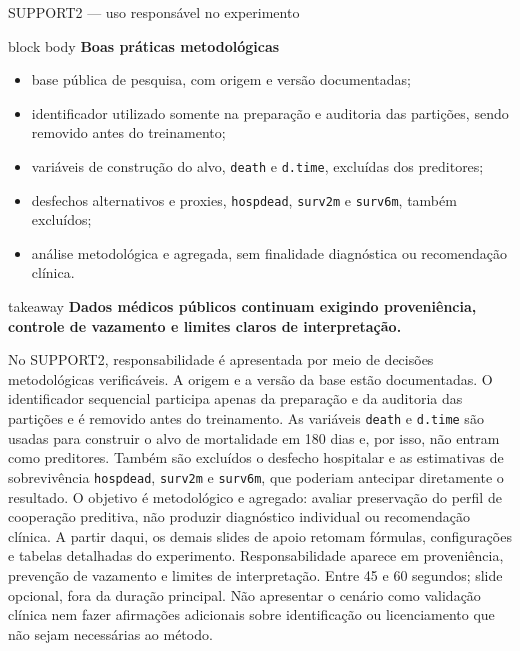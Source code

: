 \begin{frame}{SUPPORT2 — uso responsável no experimento}
  \begin{beamercolorbox}[wd=\linewidth,sep=.17cm,rounded=true]{block body}
    {\sffamily\bfseries\color{CoInfoBlue}Boas práticas metodológicas}\par\vspace{.07cm}
    \begin{itemize}\fontsize{9.0}{10.8}\selectfont\setlength{\itemsep}{.07cm}
      \item base pública de pesquisa, com origem e versão documentadas;
      \item identificador utilizado somente na preparação e auditoria das partições, sendo removido antes do treinamento;
      \item variáveis de construção do alvo, \texttt{death} e \texttt{d.time}, excluídas dos preditores;
      \item desfechos alternativos e proxies, \texttt{hospdead}, \texttt{surv2m} e \texttt{surv6m}, também excluídos;
      \item análise metodológica e agregada, sem finalidade diagnóstica ou recomendação clínica.
    \end{itemize}
  \end{beamercolorbox}

  \vspace{.12cm}
  \begin{beamercolorbox}[wd=\linewidth,sep=.12cm,rounded=true]{takeaway}
    \centering\sffamily\bfseries\fontsize{10.0}{11.9}\selectfont
    Dados médicos públicos continuam exigindo proveniência, controle de vazamento e limites claros de interpretação.
  \end{beamercolorbox}

  \speakernotes
    {No SUPPORT2, responsabilidade é apresentada por meio de decisões metodológicas verificáveis. A origem e a versão da base estão documentadas. O identificador sequencial participa apenas da preparação e da auditoria das partições e é removido antes do treinamento. As variáveis \texttt{death} e \texttt{d.time} são usadas para construir o alvo de mortalidade em 180 dias e, por isso, não entram como preditores. Também são excluídos o desfecho hospitalar e as estimativas de sobrevivência \texttt{hospdead}, \texttt{surv2m} e \texttt{surv6m}, que poderiam antecipar diretamente o resultado. O objetivo é metodológico e agregado: avaliar preservação do perfil de cooperação preditiva, não produzir diagnóstico individual ou recomendação clínica.}
    {A partir daqui, os demais slides de apoio retomam fórmulas, configurações e tabelas detalhadas do experimento.}
    {Responsabilidade aparece em proveniência, prevenção de vazamento e limites de interpretação.}
    {Entre 45 e 60 segundos; slide opcional, fora da duração principal.}
    {Não apresentar o cenário como validação clínica nem fazer afirmações adicionais sobre identificação ou licenciamento que não sejam necessárias ao método.}
\end{frame}

